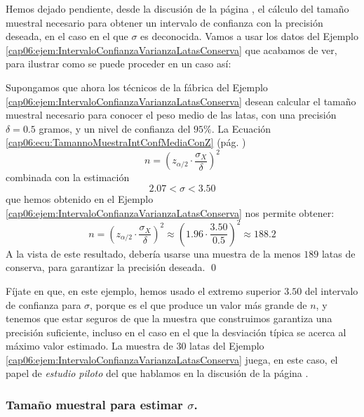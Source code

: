 Hemos dejado pendiente, desde la discusión de la página
\pageref{cap06:subsubsec:DeterminacionTamannoMuestraParaMuConSigmaDesconocida}, el cálculo del
tamaño muestral necesario para obtener un intervalo de confianza con la precisión deseada, en el
caso en el que $\sigma$ es deconocida. Vamos a usar los datos del Ejemplo
\ref{cap06:ejem:IntervaloConfianzaVarianzaLatasConserva} que acabamos de ver, para ilustrar como se
puede proceder en un caso así:
\begin{ejemplo}
 \label{cap06:ejem:DeterminacionTamannoMuestraIntConfConZUsandoIntConfSigma}
Supongamos que ahora los técnicos de la fábrica del Ejemplo
\ref{cap06:ejem:IntervaloConfianzaVarianzaLatasConserva} desean calcular el tamaño muestral
necesario para conocer el peso medio de las latas, con una precisión $\delta=0.5$ gramos, y un
nivel de confianza del $95\%$. La Ecuación \ref{cap06:ecu:TamannoMuestraIntConfMediaConZ} (pág.
\pageref{cap06:ecu:TamannoMuestraIntConfMediaConZ})
    \[
     n=\left(z_{\alpha/2}\cdot\dfrac{\sigma_X}{\delta}\right)^2
    \]
combinada con la estimación
\[ 2.07<\sigma<3.50\]
que hemos obtenido en el Ejemplo \ref{cap06:ejem:IntervaloConfianzaVarianzaLatasConserva} nos
permite obtener:
    \[
     n=\left(z_{\alpha/2}\cdot\dfrac{\sigma_X}{\delta}\right)^2\approx
        \left(1.96\cdot\dfrac{3.50}{0.5}\right)^2\approx 188.2
    \]
 A la vista de este resultado, debería usarse una muestra de la menos $189$ latas de conserva, para
 garantizar la precisión deseada.
\qed
\end{ejemplo}
Fíjate en que, en este ejemplo, hemos usado el extremo superior $3.50$ del intervalo de confianza
para $\sigma$, porque es el que produce un valor más grande de $n$, y tenemos que estar seguros de
que la muestra que construimos garantiza una precisión suficiente, incluso en el caso en el que la
desviación típica se acerca al máximo valor estimado. La muestra de $30$ latas del Ejemplo
\ref{cap06:ejem:IntervaloConfianzaVarianzaLatasConserva} juega, en este caso, el papel de {\em
estudio piloto} del que hablamos en la discusión de la
página \pageref{cap06:subsubsec:DeterminacionTamannoMuestraParaMuConSigmaDesconocida}.

\subsubsection*{Tamaño muestral para estimar $\sigma$.}

